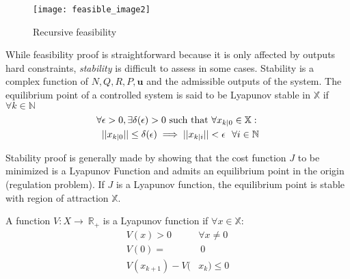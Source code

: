 \begin{figure}[h!]
	\centering
	\texttt{[image: feasible\_image2]}
	\caption{Recursive feasibility}
	\label{feasible_image2}
\end{figure}
While feasibility proof is straightforward because it is only affected by outputs hard constraints, \textit{stability} is difficult to assess in some cases.
Stability is a complex function of $N, Q, R, P, \mathbf{u}$ and the admissible outputs of the system.
The equilibrium point of a controlled system is said to be Lyapunov stable in $\mathbb{X}$ if $\forall k \in \mathbb{N}$
\begin{equation}
\begin{split}
\forall& \epsilon > 0, \exists \delta(\epsilon) >0 \textnormal{ such that } \forall x_{k|0} \in \mathbb{X}: \\
&||x_{k|0}|| \leq \delta(\epsilon) \implies ||x_{k|i}|| < \epsilon \ \ \forall i \in \mathbb{N}
\end{split}
\end{equation}

Stability proof is generally made by showing that the cost function $J$ to be minimized is a Lyapunov Function and admits an equilibrium point in the origin (regulation problem). If $J$ is a Lyapunov function, the equilibrium point is stable with region of attraction $\mathbb{X}$.

A function $V:X\rightarrow\ \mathbb{R}_+$ is a Lyapunov function if $\forall x \in \mathbb{X}$:
\begin{equation} \label{Lyap_func}
\begin{split}
	V(x)>0 \ \ & \forall x \neq 0 \\
	V(0)=&\ 0 \\
	V(x_{k+1})-V(&x_{k}) \leq 0
\end{split}
\end{equation}

